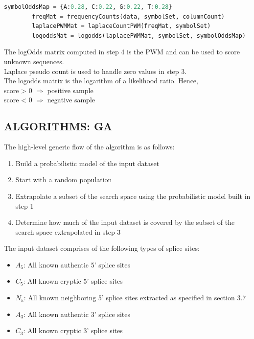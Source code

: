 \documentclass[12pt,a4paper]{article}
\begin{document}
	\begin{lstlisting}[language=Python]
        symbolOddsMap = {A:0.28, C:0.22, G:0.22, T:0.28}
        freqMat = frequencyCounts(data, symbolSet, columnCount)
        laplacePWMMat = laplaceCountPWM(freqMat, symbolSet)
        logoddsMat = logodds(laplacePWMMat, symbolSet, symbolOddsMap)	
	\end{lstlisting}
	
	The logOdds matrix computed in step 4 is the PWM and can be used to score unknown sequences.\\
	Laplace pseudo count is used to handle zero values in step 3. \\
	The logodds matrix is the logarithm of a likelihood ratio. Hence, \\
	score > 0 $\Rightarrow$ positive sample \\
    score < 0 $\Rightarrow$ negative sample

	\subsection{ALGORITHMS: GA} \label{sec:algoGA}
	
	The high-level generic flow of the algorithm is as follows:
	\begin{enumerate}
		\item Build a probabilistic model of the input dataset
		\item Start with a random population
		\item Extrapolate a subset of the search space using the probabilistic model built in step 1
		\item Determine how much of the input dataset is covered by the subset of the search space extrapolated in step 3
	\end{enumerate}

	The input dataset comprises of the following types of splice sites:
	\begin{itemize}
		\item $A_5$: All known authentic 5’ splice sites
		\item $C_5$: All known cryptic 5’ splice sites
		\item $N_5$: All known neighboring 5' splice sites extracted as specified in section 3.7
		\item $A_3$: All known authentic 3’ splice sites
		\item $C_3$: All known cryptic 3’ splice sites		
	\end{itemize}
			
\end{document}
